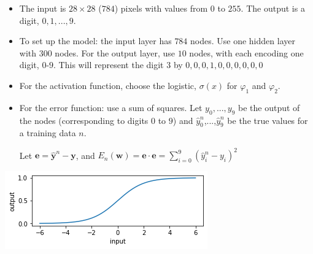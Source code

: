 \documentclass[12pt,letterpaper,noanswers]{exam}
\newcommand{\vc}[1]{\boldsymbol{#1}}
\begin{document}
\begin{tcolorbox}
\begin{itemize}
\itemsep0pt
    \item The input is $28\times 28$ ($784$) pixels with values from $0$ to $255$.  The output is a digit, $0,1,...,9$.
\item To set up the model: the input layer has $784$ nodes.  Use one hidden layer with $300$ nodes.  For the output layer, use $10$ nodes, with each encoding one digit, $0$-$9$.  This will represent the digit $3$ by $0,0,0,1,0,0,0,0,0,0$
\item For the activation function, choose the logistic, $\sigma(x)$ for $\varphi_1$ and $\varphi_2$.
\item For the error function: use a sum of squares.  Let $y_0,...,y_9$ be the output of the nodes (corresponding to digits $0$ to $9$) and $\hat{y}_0^n$,...,$\hat{y}_9^n$ be the true values for a training data $n$. 

Let $\vc{e} = \vc{\hat{y}}^n-\vc{y}$, and $E_n(\vc{w}) = \vc{e}\cdot\vc{e} = \sum\limits_{i=0}^9 (\hat{y}_i^n-y_i)^2$
\end{itemize}
\end{tcolorbox}

\renewcommand{\inputnum}{1} 
\renewcommand{\hiddennum}{1}
\renewcommand{\outputnum}{1}
\includegraphics[scale=0.7]{img/C23logistic.png}
\end{document}

